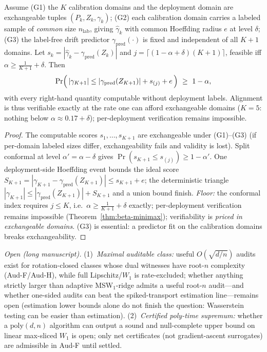 \begin{theorem}\label{thm:short-audG}\label{thm:aud-G}
Assume \textup{(G1)} the $K$ calibration domains and the deployment domain are exchangeable
tuples $(P_k,Z_k,\gamma_k)$; \textup{(G2)} each calibration domain carries a labeled sample of
\emph{common} size $n_{\mathrm{lab}}$, giving $\widehat\gamma_k$ with common Hoeffding radius $e$
at level $\delta$; \textup{(G3)} the label-free drift predictor $\gamma_{\mathrm{pred}}(\cdot)$
is fixed and independent of all $K{+}1$ domains. Let
$s_k=|\widehat\gamma_k-\gamma_{\mathrm{pred}}(Z_k)|$ and
$j=\lceil(1-\alpha+\delta)(K+1)\rceil$, feasible iff $\alpha\ge\tfrac1{K+1}+\delta$. Then
\[
\Pr\Bigl(\,|\gamma_{K+1}|\le|\gamma_{\mathrm{pred}}(Z_{K+1})|+s_{(j)}+e\,\Bigr)\ \ge\ 1-\alpha,
\]
with every right-hand quantity computable without deployment labels. Alignment is thus verifiable
exactly at the rate one can afford exchangeable domains ($K{=}5$: nothing below
$\alpha\approx0.17{+}\delta$); per-deployment verification remains impossible.
\end{theorem}
\begin{proof}
The computable scores $s_1,\dots,s_{K+1}$ are exchangeable under (G1)--(G3) (if per-domain
labeled sizes differ, exchangeability fails and validity is lost). Split conformal at level
$\alpha'=\alpha-\delta$ gives $\Pr(s_{K+1}\le s_{(j)})\ge1-\alpha'$. One deployment-side
Hoeffding event bounds the ideal score
$S_{K+1}=|\gamma_{K+1}-\gamma_{\mathrm{pred}}(Z_{K+1})|\le s_{K+1}+e$; the deterministic
triangle $|\gamma_{K+1}|\le|\gamma_{\mathrm{pred}}(Z_{K+1})|+S_{K+1}$ and a union bound finish.
\emph{Floor:} the conformal index requires $j\le K$, i.e.\ $\alpha\ge\tfrac1{K+1}+\delta$
exactly; per-deployment verification remains impossible (Theorem~\ref{thm:beta-minimax});
verifiability is \emph{priced in exchangeable domains}. (G3) is essential: a predictor fit on
the calibration domains breaks exchangeability.
\end{proof}

\noindent\emph{Open (long manuscript).}
\textup{(1)}~\emph{Maximal auditable class:} useful $O(\sqrt{d/n})$ audits exist for
rotation-closed classes whose dual witnesses have root-$n$ complexity (Aud-F/Aud-H), while full
Lipschitz/$W_1$ is rate-excluded; whether anything strictly larger than adaptive MSW$_1$-ridge
admits a useful root-$n$ audit---and whether one-sided audits can beat the spiked-transport
estimation line---remains open (estimation lower bounds alone do not finish the question:
Wasserstein testing can be easier than estimation).
\textup{(2)}~\emph{Certified poly-time supremum:} whether a $\mathrm{poly}(d,n)$ algorithm can
output a sound and null-complete upper bound on linear max-sliced $W_1$ is open; only net
certificates (not gradient-ascent surrogates) are admissible in Aud-F until settled.
